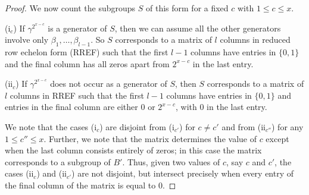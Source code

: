 \documentclass[10pt,a4paper]{amsart}
\begin{document}
\begin{proof}
    We now count the subgroups $S$ of this form for a fixed $c$ with $1 \leq c \leq x$.

    (i$_c$) If $\gamma^{2^{x-c}}$ is a generator of $S$, then we can assume all the other generators involve only $\beta_1,\ldots, \beta_{l-1}$. So $S$ corresponds to a matrix of $l$ columns in reduced row echelon form (RREF) such that the first $l-1$ columns have entries in $\{0,1\}$ and the final column has all zeros apart from $2^{x-c}$ in the last entry.
   
    (ii$_c$) If $\gamma^{2^{x-c}}$ does not occur as a generator of $S$, then $S$ corresponds to a matrix of $l$ columns in RREF such that the first $l-1$ columns have entries in $\{0,1\}$ and entries in the final column are either $0$ or $2^{x-c}$, with $0$ in the last entry.
    
    We note that the cases (i$_c$) are disjoint from (i$_{c'}$) for $c \neq c'$ and from (ii$_{c''}$) for any $1 \leq c'' \leq x$. Further, we note that the matrix determines the value of $c$ except when the last column consists entirely of zeros; in this case the matrix corresponds to a subgroup of $B'$. Thus, given two values of $c$, say $c$ and $c'$, the cases (ii$_c$) and (ii$_{c'}$) are not disjoint, but intersect precisely when every entry of the final column of the matrix is equal to 0.
    

\end{proof}
\end{document}
